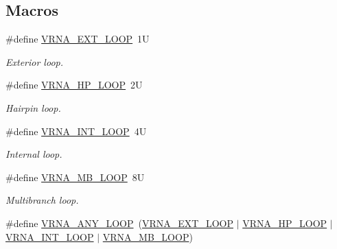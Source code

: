 \subsection*{Macros}
\begin{DoxyCompactItemize}
\item 
\mbox{\label{group__part__func__window_gaf0bb577130090f6c856d1358804250bf}} 
\#define \mbox{\hyperlink{group__part__func__window_gaf0bb577130090f6c856d1358804250bf}{V\+R\+N\+A\+\_\+\+E\+X\+T\+\_\+\+L\+O\+OP}}~1U
\begin{DoxyCompactList}\small\item\em Exterior loop. \end{DoxyCompactList}\item 
\mbox{\label{group__part__func__window_ga30170811c320f3a7b23ffff3b3343b91}} 
\#define \mbox{\hyperlink{group__part__func__window_ga30170811c320f3a7b23ffff3b3343b91}{V\+R\+N\+A\+\_\+\+H\+P\+\_\+\+L\+O\+OP}}~2U
\begin{DoxyCompactList}\small\item\em Hairpin loop. \end{DoxyCompactList}\item 
\mbox{\label{group__part__func__window_ga956a237e7d956b684b7d593cb3eca665}} 
\#define \mbox{\hyperlink{group__part__func__window_ga956a237e7d956b684b7d593cb3eca665}{V\+R\+N\+A\+\_\+\+I\+N\+T\+\_\+\+L\+O\+OP}}~4U
\begin{DoxyCompactList}\small\item\em Internal loop. \end{DoxyCompactList}\item 
\mbox{\label{group__part__func__window_gad905b71f02b3799eb84b490435aec837}} 
\#define \mbox{\hyperlink{group__part__func__window_gad905b71f02b3799eb84b490435aec837}{V\+R\+N\+A\+\_\+\+M\+B\+\_\+\+L\+O\+OP}}~8U
\begin{DoxyCompactList}\small\item\em Multibranch loop. \end{DoxyCompactList}\item 
\mbox{\label{group__part__func__window_ga1fef1ad234755db78ab6b695edce5080}} 
\#define \mbox{\hyperlink{group__part__func__window_ga1fef1ad234755db78ab6b695edce5080}{V\+R\+N\+A\+\_\+\+A\+N\+Y\+\_\+\+L\+O\+OP}}~(\mbox{\hyperlink{group__part__func__window_gaf0bb577130090f6c856d1358804250bf}{V\+R\+N\+A\+\_\+\+E\+X\+T\+\_\+\+L\+O\+OP}} $\vert$ \mbox{\hyperlink{group__part__func__window_ga30170811c320f3a7b23ffff3b3343b91}{V\+R\+N\+A\+\_\+\+H\+P\+\_\+\+L\+O\+OP}} $\vert$ \mbox{\hyperlink{group__part__func__window_ga956a237e7d956b684b7d593cb3eca665}{V\+R\+N\+A\+\_\+\+I\+N\+T\+\_\+\+L\+O\+OP}} $\vert$ \mbox{\hyperlink{group__part__func__window_gad905b71f02b3799eb84b490435aec837}{V\+R\+N\+A\+\_\+\+M\+B\+\_\+\+L\+O\+OP}})

\end{DoxyCompactItemize}
